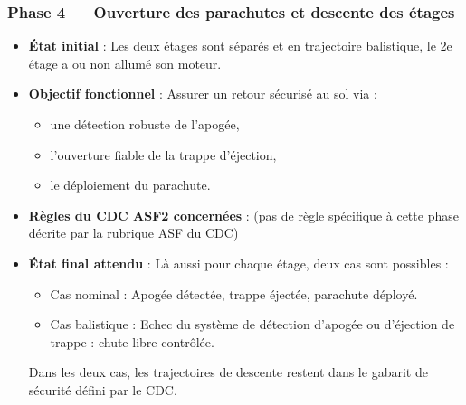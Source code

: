 \subsubsection*{Phase 4 — Ouverture des parachutes et descente des étages}
\begin{itemize}
    \item \textbf{État initial} : Les deux étages sont séparés et en trajectoire balistique, le 2e étage a ou non allumé son moteur.
    \item \textbf{Objectif fonctionnel} : Assurer un retour sécurisé au sol via :
    \begin{itemize}
        \item une détection robuste de l’apogée,
        \item l’ouverture fiable de la trappe d’éjection,
        \item le déploiement du parachute.
    \end{itemize}
    \item \textbf{Règles du \acrshort{CDC} ASF2 concernées} : (pas de règle spécifique à cette phase décrite par la rubrique ASF
    du \acrshort{CDC})
    \item \textbf{État final attendu} : Là aussi pour chaque étage, deux cas sont possibles :
    \begin{itemize}
        \item Cas nominal : Apogée détectée, trappe éjectée, parachute déployé.
        \item Cas balistique : Echec du système de détection d’apogée ou d’éjection de trappe : chute libre contrôlée.
    \end{itemize}
    Dans les deux cas, les trajectoires de descente restent dans le gabarit de sécurité défini par le \acrshort{CDC}.
\end{itemize}

